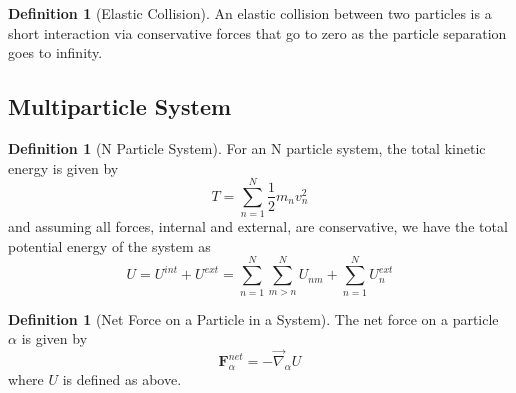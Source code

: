 \documentclass[12pt]{article}
\theoremstyle{definition}
\newtheorem{defn}[thm]{Definition}
\theoremstyle{remark}
\numberwithin{equation}{section}
\newcommand\B[1]{\textbf{#1}}
\begin{document}
\vspace{15pt}

\begin{defn}[Elastic Collision]
        An elastic collision between two particles is a short interaction via conservative forces that go to zero as the particle separation goes to infinity.
\end{defn}

\vspace{15pt}


\subsection{Multiparticle System}


\begin{defn}[N Particle System]
        For an N particle system, the total kinetic energy is given by \begin{equation}
                T = \sum\limits_{n=1}^N\frac{1}{2}m_nv_n^2
        \end{equation}
        and assuming all forces, internal and external, are conservative, we have the total potential energy of the system as \begin{equation}
                U = U^{int}+U^{ext}=\sum\limits_{n=1}^N\sum\limits_{m>n}^NU_{nm}+\sum\limits_{n=1}^NU_n^{ext}
        \end{equation}
\end{defn}

\vspace{15pt}

\begin{defn}[Net Force on a Particle in a System]
        The net force on a particle $\alpha$ is given by \begin{equation}
                \B{F}_{\alpha}^{net} = -\vec{\nabla}_{\alpha}U
        \end{equation}
        where $U$ is defined as above.
\end{defn}

\vspace{15pt}
\end{document}
